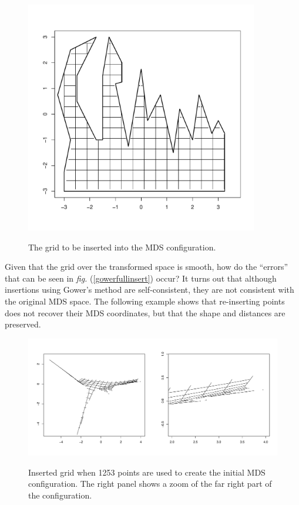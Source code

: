 \documentclass[a4paper,10pt]{article}
\newcommand{\fig}[1]{\emph{fig.} (\ref{#1})}
\begin{document}
\begin{figure}
\centering
\includegraphics[width=4in]{figs/wt2-grid-orig.pdf} \\
\caption{The grid to be inserted into the MDS configuration.}
\label{wt2-grid-orig}
\end{figure}

Given that the grid over the transformed space is smooth, how do the ``errors'' that can be seen in \fig{gowerfullinsert} occur? It turns out that although insertions using Gower's method are self-consistent, they are not consistent with the original MDS space. The following example shows that re-inserting points does not recover their MDS coordinates, but that the shape and distances are preserved.

\begin{figure}
\centering
\includegraphics[width=5in]{figs/wt2-grid-full.pdf} \\
\caption{Inserted grid when 1253 points are used to create the initial MDS configuration. The right panel shows a zoom of the far right part of the configuration.}
\label{wt2-grid-full}
\end{figure}
\end{document}
